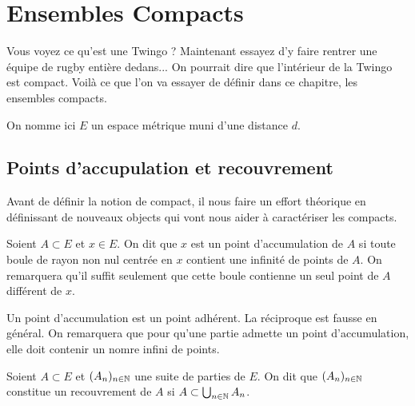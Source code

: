 \chapter{Ensembles Compacts}

\justify

\setlength{\parindent}{0pt}
\renewcommand{\labelitemi}{\textbullet} %


Vous voyez ce qu'est une Twingo ? Maintenant essayez d'y faire rentrer une équipe de rugby entière dedans...
On pourrait dire que l'intérieur de la Twingo est compact. Voilà ce que l'on va essayer de définir dans ce chapitre, les ensembles compacts. 

\vspace{0.3cm}

On nomme ici $E$ un espace métrique muni d'une distance $d$. 


\section{Points d'accupulation et recouvrement}

Avant de définir la notion de compact, il nous faire un effort théorique en définissant de nouveaux objects
qui vont nous aider à caractériser les compacts. 

\begin{definition}
    Soient $A \subset E$ et $x \in E$. On dit que $x$ est un point d'accumulation de $A$ si toute boule de rayon non nul 
    centrée en $x$ contient une infinité de points de $A$. On remarquera qu'il suffit seulement que cette boule contienne 
    un seul point de $A$ différent de $x$. 
\end{definition}

\begin{remark}
    Un point d'accumulation est un point adhérent. La réciproque est fausse en général. 
    On remarquera que pour qu'une partie admette un point d'accumulation, elle doit contenir un nomre infini de points. 
\end{remark}

\begin{definition}[Recouvrement]
    Soient $A \subset E$ et $(A_n)_{n \in \mathbb{N}}$ une suite de parties de $E$. On dit que $(A_n)_{n \in \mathbb{N}}$ constitue 
    un recouvrement de $A$ si $ A \subset \bigcup_{n \in \mathbb{N}} A_n $. 
\end{definition}

